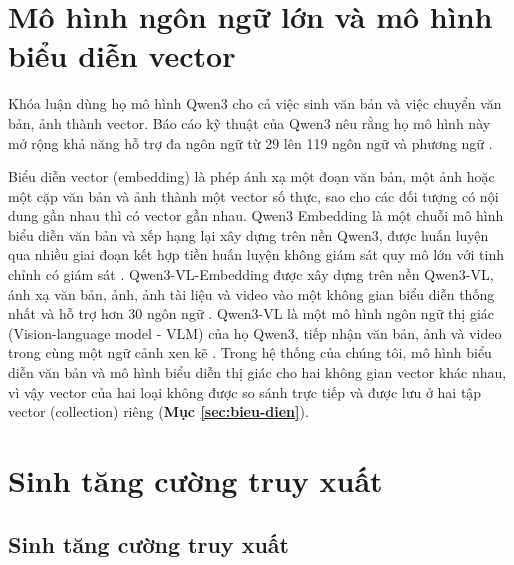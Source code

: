 
\section{Mô hình ngôn ngữ lớn và mô hình biểu diễn vector}

Khóa luận dùng họ mô hình Qwen3 cho cả việc sinh văn bản và việc chuyển văn bản, ảnh thành vector. Báo cáo kỹ thuật của Qwen3 nêu rằng họ mô hình này mở rộng khả năng hỗ trợ đa ngôn ngữ từ 29 lên 119 ngôn ngữ và phương ngữ \cite{yang2025qwen3}.

\bigbreak\noindent
Biểu diễn vector (embedding) là phép ánh xạ một đoạn văn bản, một ảnh hoặc một cặp văn bản và ảnh thành một vector số thực, sao cho các đối tượng có nội dung gần nhau thì có vector gần nhau. Qwen3 Embedding là một chuỗi mô hình biểu diễn văn bản và xếp hạng lại xây dựng trên nền Qwen3, được huấn luyện qua nhiều giai đoạn kết hợp tiền huấn luyện không giám sát quy mô lớn với tinh chỉnh có giám sát \cite{zhang2025qwen3embedding}. Qwen3-VL-Embedding được xây dựng trên nền Qwen3-VL, ánh xạ văn bản, ảnh, ảnh tài liệu và video vào một không gian biểu diễn thống nhất và hỗ trợ hơn 30 ngôn ngữ \cite{li2026qwen3vlembedding}. Qwen3-VL là một mô hình ngôn ngữ thị giác (Vision-language model - VLM) của họ Qwen3, tiếp nhận văn bản, ảnh và video trong cùng một ngữ cảnh xen kẽ \cite{bai2025qwen3vl}. Trong hệ thống của chúng tôi, mô hình biểu diễn văn bản và mô hình biểu diễn thị giác cho hai không gian vector khác nhau, vì vậy vector của hai loại không được so sánh trực tiếp và được lưu ở hai tập vector (collection) riêng (\textbf{Mục \ref{sec:bieu-dien}}).


\section{Sinh tăng cường truy xuất}

\subsection{Sinh tăng cường truy xuất}


